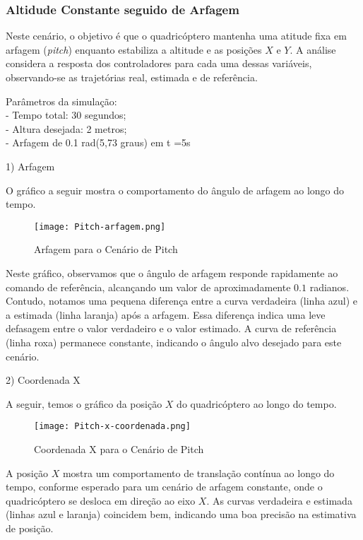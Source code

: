 \subsubsection{Altidude Constante seguido de Arfagem}

Neste cenário, o objetivo é que o quadricóptero mantenha uma atitude fixa em arfagem (\textit{pitch}) enquanto estabiliza a altitude e as posições \(X\) e \(Y\). A análise considera a resposta dos controladores para cada uma dessas variáveis, observando-se as trajetórias real, estimada e de referência.

Parâmetros da simulação: \\

- Tempo total: 30 segundos;\\
- Altura desejada: 2 metros; \\
- Arfagem de 0.1 rad(5,73 graus) em t =5s

1) Arfagem

O gráfico a seguir mostra o comportamento do ângulo de arfagem ao longo do tempo.

\begin{figure}[H]
	\centering
	\texttt{[image: Pitch-arfagem.png]}
	\caption{Arfagem para o Cenário de Pitch}
	\label{fig:pitch-arfagem}
\end{figure}

Neste gráfico, observamos que o ângulo de arfagem responde rapidamente ao comando de referência, alcançando um valor de aproximadamente \(0.1\) radianos. Contudo, notamos uma pequena diferença entre a curva verdadeira (linha azul) e a estimada (linha laranja) após a arfagem. Essa diferença indica uma leve defasagem entre o valor verdadeiro e o valor estimado. A curva de referência (linha roxa) permanece constante, indicando o ângulo alvo desejado para este cenário.

2) Coordenada X

A seguir, temos o gráfico da posição \(X\) do quadricóptero ao longo do tempo.

\begin{figure}[H]
	\centering
	\texttt{[image: Pitch-x-coordenada.png]}
	\caption{Coordenada X para o Cenário de Pitch}
	\label{fig:pitch-x-coordenada}
\end{figure}

A posição \(X\) mostra um comportamento de translação contínua ao longo do tempo, conforme esperado para um cenário de arfagem constante, onde o quadricóptero se desloca em direção ao eixo \(X\). As curvas verdadeira e estimada (linhas azul e laranja) coincidem bem, indicando uma boa precisão na estimativa de posição.

